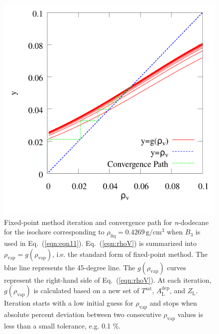 \documentclass[%
 aip,
 jcp,
 sd,%
 amsmath,amssymb,
 reprint,%
]{revtex4-1}
\begin{document}
\begin{figure} 
\includegraphics[scale=0.25]{Figures/NIST-VAL_FTT_C12_conv_0_42690.png}
\caption{Fixed-point method iteration and convergence path for \textit{n}-dodecane for the isochore corresponding to $\rho_{\mathrm{liq}}=0.4269\,\mathrm{g/cm^3}$ when $B_3$ is used in Eq.~(\ref{eqn:eqn11}). Eq.~(\ref{eqn:rhoV}) is summarized into $\rho_{\mathrm{vap}}=g(\rho_{\mathrm{vap}})$, i.e. the standard form of fixed-point method. The blue line represents the 45-degree line. The $g(\rho_{\mathrm{vap}})$ curves represent the right-hand side of Eq.~(\ref{eqn:rhoV}). At each iteration, $g(\rho_{\mathrm{vap}})$ is calculated based on a new set of $T^{\mathrm{sat}}$, $A^{\mathrm{dep}}_{\mathrm{L}}$, and $Z_{\mathrm{L}}$. Iteration starts with a low initial guess for $\rho_{\mathrm{vap}}$ and stops when absolute percent deviation between two consecutive $\rho_{\mathrm{vap}}$ values is less than a small tolerance, e.g. 0.1 \%.}
\label{fig:NIST-VALIDATION/C12/FTT/0_42690_rhov}
\end{figure}
\end{document}
